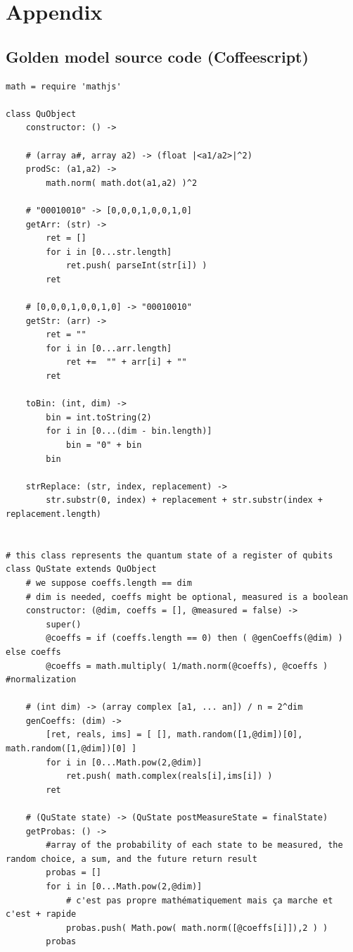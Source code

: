 \documentclass[a4paper,12pt]{report}
\begin{document}
\chapter*{Appendix}

\section{Golden model source code (Coffeescript)}

\lstset{language=Ruby}
\begin{lstlisting}
math = require 'mathjs'

class QuObject
    constructor: () ->

    # (array a#, array a2) -> (float |<a1/a2>|^2)
    prodSc: (a1,a2) ->
        math.norm( math.dot(a1,a2) )^2

    # "00010010" -> [0,0,0,1,0,0,1,0]
    getArr: (str) ->
        ret = []
        for i in [0...str.length]
            ret.push( parseInt(str[i]) )
        ret

    # [0,0,0,1,0,0,1,0] -> "00010010"
    getStr: (arr) ->
        ret = ""
        for i in [0...arr.length]
            ret +=  "" + arr[i] + ""
        ret

    toBin: (int, dim) ->
        bin = int.toString(2)
        for i in [0...(dim - bin.length)]
            bin = "0" + bin
        bin

    strReplace: (str, index, replacement) ->
        str.substr(0, index) + replacement + str.substr(index + replacement.length)


# this class represents the quantum state of a register of qubits
class QuState extends QuObject
    # we suppose coeffs.length == dim
    # dim is needed, coeffs might be optional, measured is a boolean
    constructor: (@dim, coeffs = [], @measured = false) ->
        super()
        @coeffs = if (coeffs.length == 0) then ( @genCoeffs(@dim) ) else coeffs
        @coeffs = math.multiply( 1/math.norm(@coeffs), @coeffs ) #normalization

    # (int dim) -> (array complex [a1, ... an]) / n = 2^dim
    genCoeffs: (dim) ->
        [ret, reals, ims] = [ [], math.random([1,@dim])[0], math.random([1,@dim])[0] ]
        for i in [0...Math.pow(2,@dim)]
            ret.push( math.complex(reals[i],ims[i]) )
        ret

    # (QuState state) -> (QuState postMeasureState = finalState)
    getProbas: () ->
        #array of the probability of each state to be measured, the random choice, a sum, and the future return result
        probas = []
        for i in [0...Math.pow(2,@dim)]
            # c'est pas propre mathématiquement mais ça marche et c'est + rapide
            probas.push( Math.pow( math.norm([@coeffs[i]]),2 ) )
        probas


\end{lstlisting}
\end{document}
